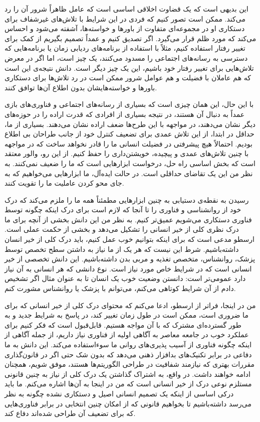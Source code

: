این بدیهی است که یک قضاوت اخلاقی اساسی است که عامل ظاهراً شرور آن را رد می‌کند.
ممکن است تصور کنیم که فردی در این شرایط با تلاش‌های غیرشفاف برای دستکاری او در مجموعه‌ای متفاوت از باورها و خواسته‌ها، آشفته می‌شود و احساس می‌کند که مورد ظلم قرار می‌گیرد.
اگر تصدیق کنیم و عمداً تصمیم بگیریم از کمک برای تغییر رفتار استفاده کنیم، مثلاً با استفاده از برنامه‌های ردیابی زمان یا برنامه‌هایی که دسترسی به رسانه‌های اجتماعی را مسدود می‌کنند، یک چیز است، اما اگر در معرض تلاش‌هایی برای تغییر رفتار خود باشیم، این یک چیز دیگر است.
دانش نتیجه‌ی این است که هم عاملان با فضیلت و هم عوامل شرور ممکن است در رد تلاش‌ها برای دستکاری باورها و خواسته‌هایشان بدون اطلاع آن‌ها توافق کنند.

با این حال، این همان چیزی است که بسیاری از رسانه‌های اجتماعی و فناوری‌های بازی عمداً به دنبال آن هستند، در نتیجه بسیاری از افرادی که قدرت اراده را در حوزه‌های دیگر نشان می‌دهند، در مواجهه با این طرح‌ها ضعف اراده نشان می‌دهند.
بسیاری از ما، حداقل در ابتدا، از این تلاش عمدی برای تضعیف کنترل خود از جانب طراحان بی اطلاع بودیم.
احتمالاً هیچ پیشرفتی در فضیلت انسانی ما را قادر نخواهد ساخت که در مواجهه با چنین تلاش‌های عمدی و پیچیده، خویشتن‌داری را حفظ کنیم.
از این رو، والور معتقد است که بخش اساسی راه حل، درخواست ابزارهایی است که ما را ضعیف نمی‌کنند.
به نظر من این یک تقاضای حداقلی است.
در حالت ایده‌آل، ما ابزارهایی می‌خواهیم که به جای محو کردن عاملیت ما را تقویت کنند.

رسیدن به نقطه‌ی دستیابی به چنین ابزارهایی مطمئناً همه ما را ملزم می‌کند که درک خود از روانشناسی و فناوری را تا آنجا که لازم است برای درک اینکه چگونه توسط فناوری دستکاری می‌شویم عمیق‌تر کنیم.
به نظر من این دانش بخشی از آنچه برای ما درک نظری کلی از خیر انسانی را تشکیل می‌دهد و بخشی از حکمت عملی است.
ارسطو مدعی است که برای اینکه بتوانیم خوب عمل کنیم، باید درک کلی از خیر انسان داشته‌باشیم.
شرط این نیست که هر یک از ما نیاز به داشتن سطح تخصص توسط پزشک، روانشناس، متخصص تغذیه و مربی بدن داشته‌باشیم.
این دانش تخصصی از خیر انسانی است که در شرایط خاص مورد نیاز است.
نوع دانشی که هر انسانی به آن نیاز دارد عمومی‌تر است: دانستن وضعیت خوب یک انسان تا به عنوان مثال اگر تشخیص دادم از آن شرایط کوتاهی می‌کنم، می‌توانم با پزشک یا روانشناس مشورت کنم.

من در اینجا، فراتر از ارسطو، ادعا می‌کنم که محتوای درک کلی از خیر انسانی که برای ما ضروری است، ممکن است در طول زمان تغییر کند، در پاسخ به شرایط جدید و به طور گسترده‌ای مشترک که با آن مواجه هستیم.
قابل‌قبول است که فکر کنیم برای عملکرد خوب در جامعه معاصر به آگاهی اولیه از فناوری نیاز داریم، از جمله آگاهی از اینکه چگونه فناوری از آسیب پذیری‌های روانی ما سوء‌استفاده می‌کند.
این دانش به ما دفاعی در برابر تکنیک‌های بدافزار ذهنی می‌دهد که بدون شک حتی اگر در قانون‌گذاری مقررات بهتری که نیازمند شفافیت در طراحی الگوریتم‌ها هستند، موفق شویم، همچنان ادامه خواهند داشت.
در واقع، به اشتراک گذاشتن یک درک کلی از نیاز به چنین قانونی مستلزم نوعی درک از خیر انسانی است که من در اینجا به آن‌ها اشاره می‌کنم.
ما باید درکی اساسی از اینکه یک تصمیم انسانی اصیل و دستکاری نشده چگونه به نظر می‌رسد داشته‌باشیم تا بخواهیم قانونی که از امکان چنین انتخابی در برابر فناوری‌هایی که برای تضعیف آن طراحی شده‌اند دفاع کند.
\newline
\newline


